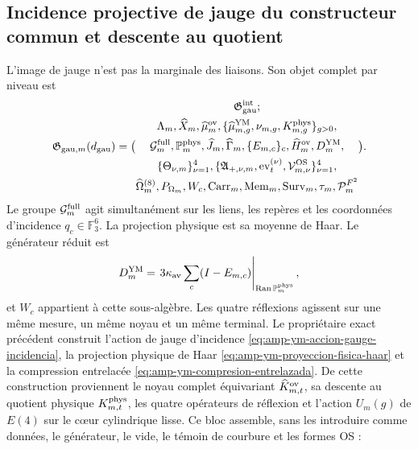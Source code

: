 
\subsection{Incidence projective de jauge du constructeur commun et descente au quotient}

L'image de jauge n'est pas la marginale des liaisons. Son objet complet par niveau est
\begin{equation}\label{eq:pdf2-g-gau-explicito}
 \mathfrak G_{{\rm gau},m}(d_{\rm gau})=
 \bigl(
 \begin{gathered}
  \mathfrak G_{\rm gau}^{\rm int};\\
  \Lambda_m,\widehat X_m,\widehat\mu_m^{\rm ov},
  \{\widehat\mu_{m,g}^{\rm YM},\nu_{m,g},K_{m,g}^{\rm phys}\}_{g>0},\\
  \mathcal G_m^{\rm full},\mathbb P_m^{\rm phys},
  \widehat J_m,\widehat\Gamma_m,
  \{E_{m,c}\}_c,\widehat H_m^{\rm ov},D_m^{\rm YM},\\
  \{\Theta_{\nu,m}\}_{\nu=1}^4,
  \{\mathfrak A_{+,\nu,m},\operatorname{ev}_{t}^{(\nu)},
      \mathcal V_{m,\nu}^{\rm OS}\}_{\nu=1}^4,\\
  \widehat\Omega_m^{(8)},P_{\Omega_m},W_c,
  \operatorname{Carr}_m,\operatorname{Mem}_m,
  \operatorname{Surv}_m,\tau_m,\mathcal P_m^{F^2}
 \end{gathered}
 \bigr).
\end{equation}
Le groupe $\mathcal G_m^{\rm full}$ agit simultanément sur les liens, les repères et les
coordonnées d’incidence $q_c\in\mathbb F_3^6$. La projection physique est sa moyenne
de Haar. Le générateur réduit est
\begin{equation}\label{eq:pdf2-g-gau-generador-estructural}
 D_m^{\rm YM}
 =\left.3\kappa_{\rm av}\sum_c(I-E_{m,c})
  \right|_{\operatorname{Ran}\mathbb P_m^{\rm phys}},
\end{equation}
et $W_c$ appartient à cette sous-algèbre. Les quatre réflexions agissent sur une même mesure, un même noyau et un même terminal.
Le propriétaire exact précédent construit l'action de jauge d'incidence \eqref{eq:amp-ym-accion-gauge-incidencia}, la projection physique de Haar \eqref{eq:amp-ym-proyeccion-fisica-haar} et la compression entrelacée \eqref{eq:amp-ym-compresion-entrelazada}. De cette construction proviennent le noyau complet équivariant $\widehat K_{m,t}^{\rm ov}$, sa descente au quotient physique $K_{m,t}^{\rm phys}$, les quatre opérateurs de réflexion et l'action $U_m(g)$ de $E(4)$ sur le cœur cylindrique lisse. Ce bloc assemble, sans les introduire comme données, le générateur, le vide, le témoin de courbure et les formes OS :
